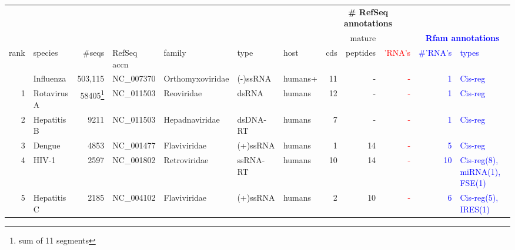 
\begin{center}
\begin{tabular}{|r|l|r|l|l|l|l||r|r|r||r|l||}
\multicolumn{7}{c}{}                                                                     & \multicolumn{3}{c}{\textbf{\# RefSeq annotations}}    & \multicolumn{2}{c}{}                                            \\ \cline{8-10}
\multicolumn{7}{c||}{}                                                                            &       &   mature &                           & \multicolumn{2}{c}{\textcolor{blue}{\textbf{Rfam annotations}}} \\ \cline{1-7} \cline{11-12}
  rank & species            &       \#seqs & RefSeq accn     & family         & type     & host   &   cds & peptides & \textcolor{red}{'RNA's}   & \textcolor{blue}{\#'RNA's} & \textcolor{blue}{types} \\ \hline
       & Influenza          &   503,115    & NC\_007370      &Orthomyxoviridae& (-)ssRNA & humans+&    11 &        - & \textcolor{red}{-}        & \textcolor{blue}{1}        & \textcolor{blue}{Cis-reg} \\ 
     1 & Rotavirus A        &58405\footnote{sum of 11 segments}& NC\_011503&Reoviridae&dsRNA&humans&   12 &        - & \textcolor{red}{-}        & \textcolor{blue}{1}        & \textcolor{blue}{Cis-reg}  \\ %
     2 & Hepatitis B        &         9211 & NC\_011503      & Hepadnaviridae & dsDNA-RT & humans &     7 &        - & \textcolor{red}{-}        & \textcolor{blue}{1}        & \textcolor{blue}{Cis-reg} \\ %
     3 & Dengue             &         4853 & NC\_001477      & Flaviviridae   & (+)ssRNA & humans &     1 &       14 & \textcolor{red}{-}        & \textcolor{blue}{5}        & \textcolor{blue}{Cis-reg}  \\ 
     4 & HIV-1              &        2597  & NC\_001802      & Retroviridae   & ssRNA-RT & humans &    10 &       14 & \textcolor{red}{-}        & \textcolor{blue}{10}       & \textcolor{blue}{Cis-reg(8), miRNA(1), FSE(1)} \\
     5 & Hepatitis C        &        2185  & NC\_004102      & Flaviviridae   & (+)ssRNA & humans &     2 &       10 & \textcolor{red}{-}        & \textcolor{blue}{6}        & \textcolor{blue}{Cis-reg(5), IRES(1)} \\

\end{tabular}
\end{center}
